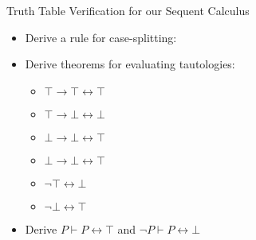 \documentclass[presentation]{beamer}
\begin{document}
\begin{frame}[label={sec:orgheadline28}]{Truth Table Verification for our Sequent Calculus}
\begin{itemize}
\item Derive a rule for case-splitting:
\end{itemize}

\begin{prooftree}
\end{prooftree}

\begin{itemize}
\item Derive theorems for evaluating tautologies:
\begin{itemize}
\item \(\top \rightarrow \top \leftrightarrow \top\)
\item \(\top \rightarrow \bot \leftrightarrow \bot\)
\item \(\bot \rightarrow \bot \leftrightarrow \top\)
\item \(\bot \rightarrow \bot \leftrightarrow \top\)
\item \(\neg\top \leftrightarrow \bot\)
\item \(\neg\bot \leftrightarrow \top\)
\end{itemize}

\item Derive
\(P \vdash P \leftrightarrow \top\) and \(\neg P \vdash P \leftrightarrow \bot\)
\end{itemize}
\end{frame}
\end{document}
